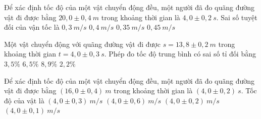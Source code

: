 \begin{ex}
Để xác định tốc độ của một vật chuyển động đều, một người đã đo quãng đường vật đi được bằng $20,0 \pm 0,4\ m$ trong khoảng thời gian là $4,0 \pm 0,2\ s$. Sai số tuyệt đối của vận tốc là
\choice
{$0,3\ m/s$}
{$0,4\ m/s$}
{\True $0,35\ m/s$}
{$0,45\ m/s$}
\loigiai{
}
\end{ex}
\begin{ex}
Một vật chuyển động với quãng đường vật đi được $s=13,8 \pm 0,2\ m$ trong khoảng thời gian $t=4,0 \pm 0,3\ s$. Phép đo tốc độ trung bình có sai số tỉ đối bằng
\choice
{$3,5\%$}
{$6,5\%$}
{\True $8,9\%$}
{$2,2\%$}
\end{ex}
\begin{ex}
Để xác định tốc độ của một vật chuyển động đều, một người đã đo quãng đường vật đi được bằng $(16,0 \pm 0,4)\ m$ trong khoảng thời gian là $(4,0 \pm 0,2)\ s$. Tốc độ của vật là
\choice
{\True $(4,0 \pm 0,3)\ m/s$}
{$(4,0 \pm 0,6)\ m/s$}
{$(4,0 \pm 0,2)\ m/s$}
{$(4,0 \pm 0,1)\ m/s$}
\end{ex}


